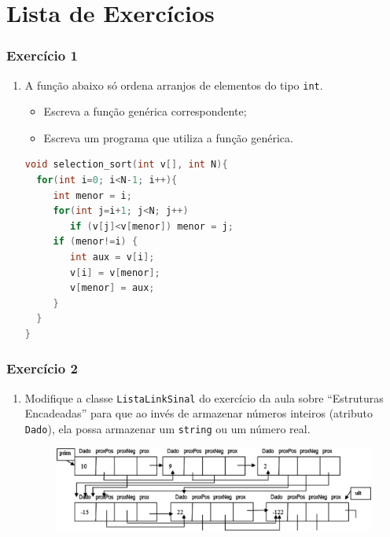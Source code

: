 \documentclass[aspectratio=169]{beamer}
\newcommand\setItemnumber[1]{\setcounter{enumi}{\numexpr#1-1\relax}}
\begin{document}
\section{Lista de Exercícios}

\begin{frame}[fragile]\frametitle{Exercício 1}
\begin{enumerate}
	\setItemnumber{1}
	\item A função abaixo só ordena arranjos de elementos do tipo \texttt{int}.
	\begin{itemize}
		\item Escreva a função genérica correspondente;
		\item Escreva um programa que utiliza a função genérica.
	\end{itemize}
\begin{lstlisting}[language=C++,basicstyle=\ttfamily\scriptsize]
void selection_sort(int v[], int N){
  for(int i=0; i<N-1; i++){
     int menor = i;
     for(int j=i+1; j<N; j++)
        if (v[j]<v[menor]) menor = j;
     if (menor!=i) {
        int aux = v[i];
        v[i] = v[menor];
        v[menor] = aux;
     }
  }
}
\end{lstlisting}
\end{enumerate}
\end{frame}

\begin{frame}[fragile]\frametitle{Exercício 2}
\begin{enumerate}
	\setItemnumber{2}
	\item Modifique a classe \texttt{ListaLinkSinal} do exercício da aula sobre ``Estruturas Encadeadas'' para que ao invés de armazenar números inteiros (atributo \texttt{Dado}), ela possa armazenar um \texttt{string} ou um número real.
\begin{figure}[h]
	\includegraphics[height=0.35\paperheight]{pucrs-ec-poo-unidade_15-templates-laminas-estrutura_encadeada.png}
\end{figure}
\end{enumerate}
\end{frame}
\end{document}
